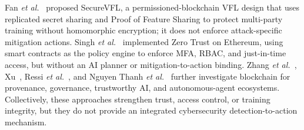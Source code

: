 \documentclass[10pt, conference]{IEEEtran}
\begin{document}
Fan \textit{et al.}~\cite{fan2025} proposed SecureVFL, a permissioned-blockchain VFL design that uses replicated secret sharing and Proof of Feature Sharing to protect multi-party training without homomorphic encryption; it does not enforce attack-specific mitigation actions. Singh \textit{et al.}~\cite{singh2025zt} implemented Zero Trust on Ethereum, using smart contracts as the policy engine to enforce MFA, RBAC, and just-in-time access, but without an AI planner or mitigation-to-action binding. Zhang \textit{et al.}~\cite{zhang2024exploit}, Xu~\cite{xu2026}, Ressi \textit{et al.}~\cite{ressi2024}, and Nguyen Thanh \textit{et al.}~\cite{nguyen2024} further investigate blockchain for provenance, governance, trustworthy AI, and autonomous-agent ecosystems. Collectively, these approaches strengthen trust, access control, or training integrity, but they do not provide an integrated cybersecurity detection-to-action mechanism.
\end{document}
